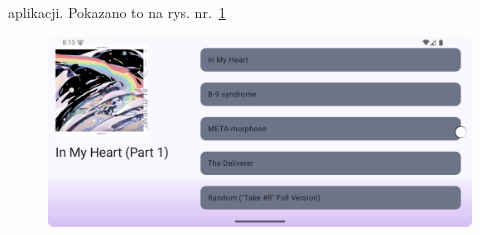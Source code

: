  aplikacji. Pokazano to na rys. nr.~\ref{fig:tutorial_rotate}

\begin{figure}[H]
	\centering
	\includegraphics[width=1\textwidth]{images/tutorial_rotate.png}
	\caption{}
	\label{fig:tutorial_rotate}
\end{figure}
